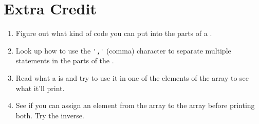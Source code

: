 \section{Extra Credit}

\begin{enumerate}
\item Figure out what kind of code you can put into the parts of a .
\item Look up how to use the \verb|','| (comma) character to separate multiple
    statements in the parts of the .
\item Read what a  is and try to use it in one of the elements of the
     array to see what it'll print.
\item See if you can assign an element from the  array to the
     array before printing both.  Try the inverse.
\end{enumerate}


